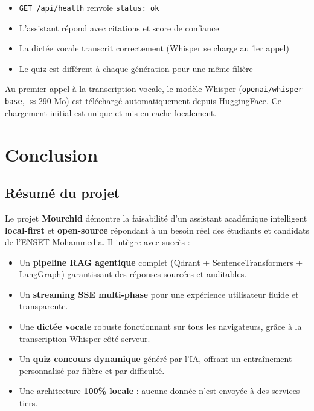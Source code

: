 \documentclass[11pt, a4paper]{article}
\begin{document}
\begin{alertsuccess}
\begin{itemize}\setlength{\itemsep}{0.2em}
    \item \texttt{GET /api/health} renvoie \texttt{status: ok}
    \item L'assistant répond avec citations et score de confiance
    \item La dictée vocale transcrit correctement (Whisper se charge au 1er appel)
    \item Le quiz est différent à chaque génération pour une même filière
\end{itemize}
\end{alertsuccess}

\begin{alertwarning}
Au premier appel à la transcription vocale, le modèle Whisper (\texttt{openai/whisper-base}, \(\approx\)290 Mo) est téléchargé automatiquement depuis HuggingFace. Ce chargement initial est unique et mis en cache localement.
\end{alertwarning}

\section{Conclusion}

\subsection{Résumé du projet}

Le projet \textbf{Mourchid} démontre la faisabilité d'un assistant académique intelligent \textbf{local-first} et \textbf{open-source} répondant à un besoin réel des étudiants et candidats de l'ENSET Mohammedia. Il intègre avec succès :

\begin{itemize}
    \item Un \textbf{pipeline RAG agentique} complet (Qdrant + SentenceTransformers + LangGraph) garantissant des réponses sourcées et auditables.
    \item Un \textbf{streaming SSE multi-phase} pour une expérience utilisateur fluide et transparente.
    \item Une \textbf{dictée vocale} robuste fonctionnant sur tous les navigateurs, grâce à la transcription Whisper côté serveur.
    \item Un \textbf{quiz concours dynamique} généré par l'IA, offrant un entraînement personnalisé par filière et par difficulté.
    \item Une architecture \textbf{100\% locale} : aucune donnée n'est envoyée à des services tiers.
\end{itemize}
\end{document}
